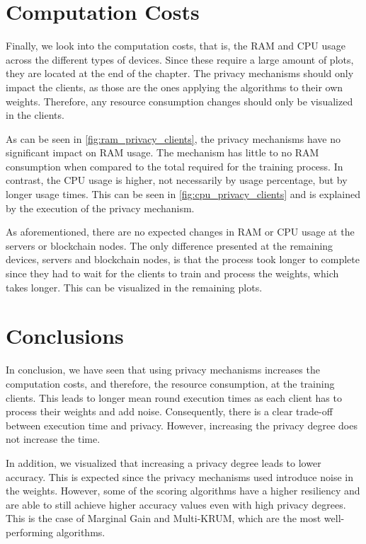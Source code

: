 \section{Computation Costs}

Finally, we look into the computation costs, that is, the RAM and CPU usage across the different types of devices. Since these require a large amount of plots, they are located at the end of the chapter. The privacy mechanisms should only impact the clients, as those are the ones applying the algorithms to their own weights. Therefore, any resource consumption changes should only be visualized in the clients.

As can be seen in \autoref{fig:ram_privacy_clients}, the privacy mechanisms have no significant impact on RAM usage. The mechanism has little to no RAM consumption when compared to the total required for the training process. In contrast, the CPU usage is higher, not necessarily by usage percentage, but by longer usage times. This can be seen in \autoref{fig:cpu_privacy_clients} and is explained by the execution of the privacy mechanism.

As aforementioned, there are no expected changes in RAM or CPU usage at the servers or blockchain nodes.  The only difference presented at the remaining devices, servers and blockchain nodes, is that the process took longer to complete since they had to wait for the clients to train and process the weights, which takes longer. This can be visualized in the remaining plots.

\section{Conclusions}

In conclusion, we have seen that using privacy mechanisms increases the computation costs, and therefore, the resource consumption, at the training clients. This leads to longer mean round execution times as each client has to process their weights and add noise. Consequently, there is a clear trade-off between execution time and privacy. However, increasing the privacy degree does not increase the time.

In addition, we visualized that increasing a privacy degree leads to lower accuracy. This is expected since the privacy mechanisms used introduce noise in the weights. However, some of the scoring algorithms have a higher resiliency and are able to still achieve higher accuracy values even with high privacy degrees. This is the case of Marginal Gain and Multi-KRUM, which are the most well-performing algorithms.

